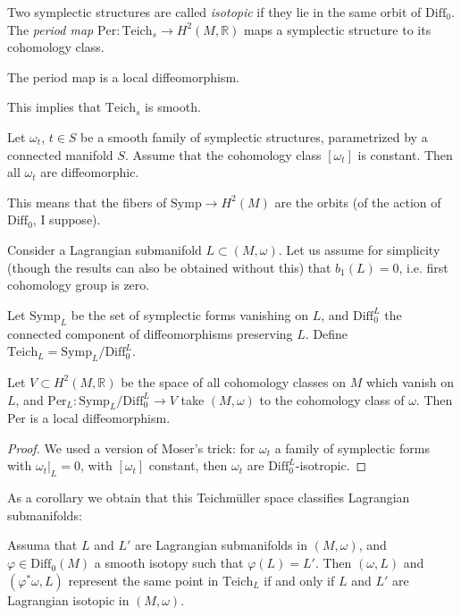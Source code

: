 Two symplectic structures are called {\it isotopic} if they lie
in the same orbit of $\text{Diff}_0$.
The {\it period map} $\text{Per}:\text{Teich}_s \to H^{2}(M,\mathbb{R})$ 
maps a symplectic structure to its cohomology class.

\begin{theorem}[Moser, 1965]
\label{theorem-period-map-is-local-diffeo}
The period map is a local diffeomorphism.
\end{theorem}

\noindent
This implies that $\text{Teich}_s$ is smooth.

\begin{theorem}
\label{theorem-mosers-trick}
Let $\omega_t$, $t \in S$ be a smooth family of symplectic
structures, parametrized by a connected manifold $S$.
Assume that the cohomology class  $[\omega_t]$ is constant.
Then all $\omega_t$ are diffeomorphic.
\end{theorem}

\noindent
This means that the fibers of $\text{Symp}\to H^{2}(M)$ 
are the orbits (of the action of $\text{Diff}_0$, I suppose).

\medskip\noindent
Consider a Lagrangian submanifold $L \subset (M,\omega)$.
Let us assume for simplicity (though the results 
can also be obtained without this) that $b_1(L)=0$,
i.e. first cohomology group is zero.

Let $\text{Symp}_L$ be the set of symplectic forms vanishing on $L$,
and $\text{Diff}_0^L$ the connected component of diffeomorphisms
preserving $L$.
Define $\text{Teich}_L=\text{Symp}_L/\text{Diff}_0^L$.

\begin{theorem}
\label{theorem-}
Let $V \subset H^{2}(M,\mathbb{R})$ be the space of all
cohomology classes on $M$ which vanish on $L$,
and $\text{Per}_L: \text{Symp}_L/\text{Diff}^L_0 \to V$
take $(M,\omega)$ to the cohomology class of $\omega$.
Then Per is a local diffeomorphism.
\end{theorem}

\begin{proof}
We used a version of Moser's trick: for $\omega_t$ a family
of symplectic forms with $\omega_t|_{L}=0$,
with $[\omega_t]$ constant, then $\omega_t$ 
are $\text{Diff}_0^L$-isotropic.
\end{proof}

\noindent
As a corollary we obtain that this Teichmüller space
classifies Lagrangian submanifolds:

\begin{lemma}
\label{lemma-techmuller-classifies-lagrangian-submanifolds}
Assuma that $L$ and $L'$ are Lagrangian submanifolds in $(M,\omega)$,
and $\varphi \in \text{Diff}_0(M)$ a smooth isotopy such that
$\varphi(L)=L'$. Then $(\omega,L)$ and $(\varphi^*\omega,L)$ 
represent the same point in $\text{Teich}_L$ if and only if
$L$ and $L'$ are Lagrangian isotopic in $(M,\omega)$.
\end{lemma}

